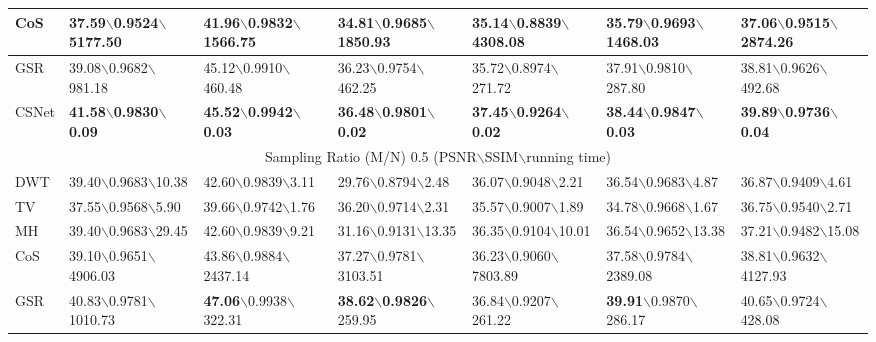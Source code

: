 \documentclass[5pt]{article}
\begin{document}
\begin{table*}[t]
\begin{tabular}{|l|l|l|l|l|l|l|}
\hline
CoS & 37.59$\backslash$0.9524$\backslash$\tiny 5177.50 & 41.96$\backslash$0.9832$\backslash$\tiny 1566.75 & 34.81$\backslash$0.9685$\backslash$\tiny 1850.93 & 35.14$\backslash$0.8839$\backslash$\tiny 4308.08 & 35.79$\backslash$0.9693$\backslash$\tiny 1468.03 & 37.06$\backslash$0.9515$\backslash$\tiny 2874.26\\
\hline
GSR & 39.08$\backslash$0.9682$\backslash$981.18 & 45.12$\backslash$0.9910$\backslash$460.48 & 36.23$\backslash$0.9754$\backslash$462.25 & 35.72$\backslash$0.8974$\backslash$271.72 & 37.91$\backslash$0.9810$\backslash$287.80 & 38.81$\backslash$0.9626$\backslash$492.68\\
\hline
CSNet & \textbf{41.58}$\backslash$\textbf{0.9830}$\backslash$\textbf{0.09} & \textbf{45.52}$\backslash$\textbf{0.9942}$\backslash$\textbf{0.03} & \textbf{36.48}$\backslash$\textbf{0.9801}$\backslash$\textbf{0.02} & \textbf{37.45}$\backslash$\textbf{0.9264}$\backslash$\textbf{0.02} & \textbf{38.44}$\backslash$\textbf{0.9847}$\backslash$\textbf{0.03} & \textbf{39.89}$\backslash$\textbf{0.9736}$\backslash$\textbf{0.04}\\
\hline
\multicolumn{7}{|c|}{Sampling Ratio (M/N) 0.5 (PSNR$\backslash$SSIM$\backslash$running time)}\\
\hline
DWT & 39.40$\backslash$0.9683$\backslash$10.38 & 42.60$\backslash$0.9839$\backslash$3.11 & 29.76$\backslash$0.8794$\backslash$2.48 & 36.07$\backslash$0.9048$\backslash$2.21 & 36.54$\backslash$0.9683$\backslash$4.87 & 36.87$\backslash$0.9409$\backslash$4.61\\
\hline
TV & 37.55$\backslash$0.9568$\backslash$5.90 & 39.66$\backslash$0.9742$\backslash$1.76 & 36.20$\backslash$0.9714$\backslash$2.31 & 35.57$\backslash$0.9007$\backslash$1.89 & 34.78$\backslash$0.9668$\backslash$1.67 & 36.75$\backslash$0.9540$\backslash$2.71\\
\hline
MH & 39.40$\backslash$0.9683$\backslash$29.45 & 42.60$\backslash$0.9839$\backslash$9.21 & 31.16$\backslash$0.9131$\backslash$13.35 & 36.35$\backslash$0.9104$\backslash$10.01 & 36.54$\backslash$0.9652$\backslash$13.38 & 37.21$\backslash$0.9482$\backslash$15.08\\
\hline
CoS & 39.10$\backslash$0.9651$\backslash$\tiny 4906.03 & 43.86$\backslash$0.9884$\backslash$\tiny 2437.14 & 37.27$\backslash$0.9781$\backslash$\tiny 3103.51 & 36.23$\backslash$0.9060$\backslash$\tiny 7803.89 & 37.58$\backslash$0.9784$\backslash$\tiny 2389.08 & 38.81$\backslash$0.9632$\backslash$\tiny 4127.93\\
\hline
GSR & 40.83$\backslash$0.9781$\backslash$\tiny 1010.73 & \textbf{47.06}$\backslash$0.9938$\backslash$322.31 & \textbf{38.62}$\backslash$\textbf{0.9826}$\backslash$259.95 & 36.84$\backslash$0.9207$\backslash$261.22 & \textbf{39.91}$\backslash$0.9870$\backslash$286.17 & 40.65$\backslash$0.9724$\backslash$428.08\\

\end{tabular}
\end{table*}
\end{document}
